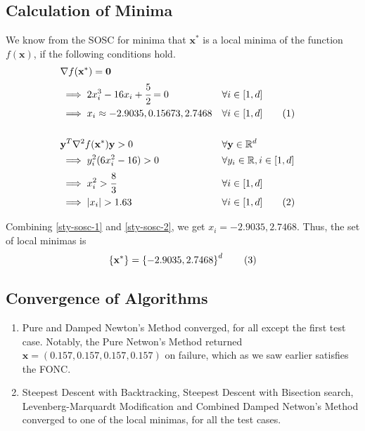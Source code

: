 \documentclass[a4paper]{article}
\newcommand\numberthis{\addtocounter{equation}{1}\tag{\theequation}}
\begin{document}
\subsection{Calculation of Minima}

We know from the SOSC for minima that $\textbf{x}^*$ is a local minima of the function $f(\textbf{x})$, if the following conditions hold.
\begin{align*}
&\nabla f(\textbf{x}^*) = \textbf{0} \\
&\implies 2 x_i^3 - 16 x_i + \cfrac{5}{2} = 0 &&\forall i \in [1, d] \\
&\implies x_i \approx -2.9035, 0.15673, 2.7468 &&\forall i \in [1, d] \numberthis \label{sty-sosc-1} \\ \\
&\textbf{y}^T \nabla^2 f(\textbf{x}^*) \textbf{y} > 0 &&\forall \textbf{y} \in \mathbb{R}^d \\
&\implies y_i^2 (6 x_i^2 - 16) > 0 &&\forall y_i \in \mathbb{R}, i \in [1, d] \\
&\implies x_i^2 > \cfrac{8}{3} &&\forall i \in [1, d] \\
&\implies |x_i| > 1.63 &&\forall i \in [1, d] \numberthis \label{sty-sosc-2}
\end{align*}

Combining \eqref{sty-sosc-1} and \eqref{sty-sosc-2}, we get $x_i = -2.9035, 2.7468$. Thus, the set of local minimas is
\begin{align*}
\left\{\textbf{x}^*\right\} = \left\{-2.9035, 2.7468\right\}^d \numberthis \label{sty-minima}
\end{align*}

\subsection{Convergence of Algorithms}

\begin{enumerate}

\item Pure and Damped Newton's Method converged, for all except the first test case. Notably, the Pure Netwon's Method returned $\textbf{x} = (0.157, 0.157, 0.157, 0.157)$ on failure, which as we saw earlier satisfies the FONC.

\item Steepest Descent with Backtracking, Steepest Descent with Bisection search, Levenberg-Marquardt Modification and Combined Damped Netwon's Method converged to one of the local minimas, for all the test cases.

\end{enumerate}
\end{document}
